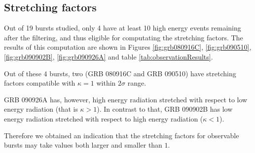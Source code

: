 \documentclass{article}
\begin{document}
\subsection{Stretching factors}

Out of 19 bursts studied, only 4 have at least 10 high energy events
remaining after the filtering, and thus eligible for computating the
stretching factors. The results of this computation are shown in
Figures \ref{fig:grb080916C}, \ref{fig:grb090510},
\ref{fig:grb090902B}, \ref{fig:grb090926A} and table
\ref{tab:observationResults}.

Out of these 4 bursts, two (GRB 080916C and GRB 090510) have
stretching factors compatible with $\kappa = 1$ within $2\sigma$
range.

GRB 090926A has, however, high energy radiation stretched with respect
to low energy radiation (that is $\kappa > 1$). In contrast to that,
GRB 090902B has low energy radiation stretched with respect to high
energy radiation ($\kappa < 1$).

Therefore we obtained an indication that the stretching factors for
observable bursts may take values both larger and smaller than $1$.
\end{document}
